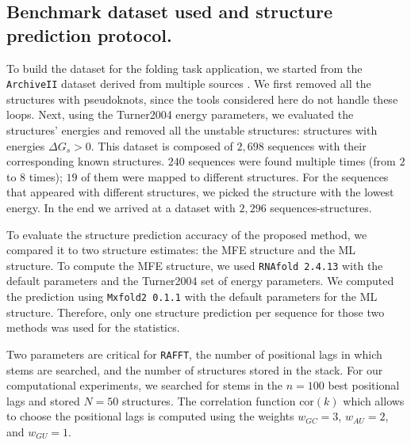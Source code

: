 \subsection{Benchmark dataset used and structure prediction protocol. }
To build the dataset for the folding task application, we started from the \texttt{ArchiveII} dataset derived from multiple sources \cite{andronescu08_rna_stran,brown98_ribon_p_datab,bellaousov10_probk,daub08_rna_wikip,damberger94_compar_datab_group_i_intron_struc,zwieb00_tmrdb,zwieb03_tmrdb,waring84_asses_model_intron_rna_secon,specht97_compil_rrna_rrna_gene_sequen,sprinzl98_compil_trna_sequen_sequen_trna_genes,sloma16_exact_calcul_loop_format_probab,schnare96_compr_compar_struc_charac_eukar,mathews99_expan_sequen_depen_therm_param,samuelsson99_signal_recog_partic_datab_srpdb,gutell93_compil_large_subun_like_ribos_rna_struc,gutell94_collec_small_subun_like_ribos_rna_struc,gardner09_rfam}. We first removed all the structures with pseudoknots, since the tools considered here do not handle these loops. Next, using the Turner2004 energy parameters, we evaluated the structures' energies and removed all the unstable structures: structures with energies $\Delta G_s > 0$. This dataset is composed of $2,698$ sequences with their corresponding known structures. $240$ sequences were found multiple times (from $2$ to $8$ times); $19$ of them were mapped to different structures. For the sequences that appeared with different structures, we picked the structure with the lowest energy. In the end we arrived at a dataset with $2,296$ sequences-structures.

To evaluate the structure prediction accuracy of the proposed method, we compared it to two structure estimates: the MFE structure and the ML structure. To compute the MFE structure, we used \texttt{RNAfold 2.4.13} with the default parameters and the Turner2004 set of energy parameters. We computed the prediction using \texttt{Mxfold2 0.1.1} with the default parameters for the ML structure. Therefore, only one structure prediction per sequence for those two methods was used for the statistics.

Two parameters are critical for \texttt{RAFFT}, the number of positional lags in which stems are searched, and the number of structures stored in the stack. For our computational experiments, we searched for stems in the $n=100$ best positional lags and stored $N=50$ structures. The correlation function \(\text{cor}(k)\) which allows to choose the positional lags is computed using the weights \(w_{GC}=3\), \(w_{AU}=2\), and \(w_{GU}=1\).

